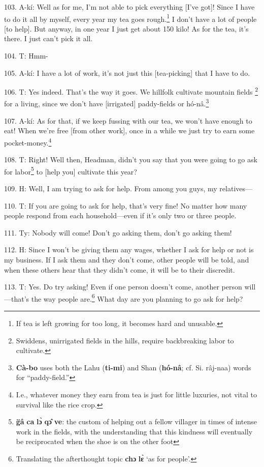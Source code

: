 103. A-kí: Well as for me, I'm not able to pick everything [I've got]! Since
I have to do it all by myself, every year my tea goes rough.\footnote{If tea is left growing for too long, it becomes hard and unusable.} I don't have
a lot of people [to help]. But anyway, in one year I just get about 150 kilo!
As for the tea, it's there. I just can't pick it all.

104. T: Hmm-

105. A-kí: I have a lot of work, it's not just this [tea-picking] that I have
to do.

106. T: Yes indeed. That's the way it goes. We hillfolk cultivate mountain fields
\footnote{Swiddens, unirrigated fields in the hills, require backbreaking labor to cultivate.} for a living, since we don't have [irrigated] paddy-fields or hó-nâ.\footnote{\textbf{Cà-bo} uses both the Lahu (\textbf{ti-mi}) and Shan (\textbf{hó-nâ}; cf. Si. râj-naa) words for ``paddy-field.''}

107. A-kí: As for that, if we keep fussing with our tea, we won't have enough
to eat! When we're free [from other work], once in a while we just try to earn
some pocket-money.\footnote{I.e., whatever money they earn from tea is just for little luxuries, not vital to survival like the rice crop.}

108. T: Right! Well then, Headman, didn't you say that you were going to go ask
for labor\footnote{\textbf{g̈â} \textbf{ca} \textbf{lɔ̀} \textbf{qɔ̂} \textbf{ve}: the custom of helping out a fellow villager in times of intense work in the fields, with the understanding that this kindness will eventually be reciprocated when the shoe is on the other foot} to [help you] cultivate this year?

109. H: Well, I am trying to ask for help. From among you guys, my relatives---

110. T: If you are going to ask for help, that's very fine! No matter how many
people respond from each household---even if it's only two or three people.

111. Ty: Nobody will come! Don't go asking them, don't go asking them!

112. H: Since I won't be giving them any wages, whether I ask for help or
not is my business. If I ask them and they don't come, other people will be told,
and when these others hear that they didn't come, it will be to their discredit.

113. T: Yes. Do try asking! Even if one person doesn't come, another person will---that's
the way people are.\footnote{Translating the afterthought topic \textbf{chɔ} \textbf{lɛ̀} `as for people'.} What day are you planning to go ask for help?

